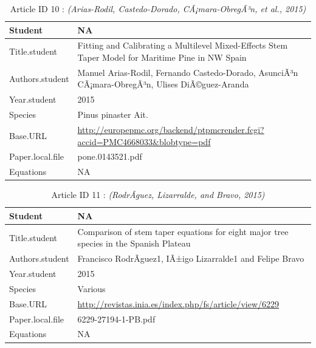 \documentclass[]{article}
\begin{document}
\begin{table}
\caption{
Article ID 10 : \textit{(Arias-Rodil, Castedo-Dorado, CÃ¡mara-ObregÃ³n, et al., 2015)}\\
}
\begin{tabular}{p{} p{}}
\hline
Student & NA \\ \hline
Title.student & Fitting and Calibrating a Multilevel Mixed-Effects Stem Taper Model for Maritime Pine in NW Spain \\ \hline
Authors.student & Manuel Arias-Rodil, Fernando Castedo-Dorado, AsunciÃ³n CÃ¡mara-ObregÃ³n, Ulises DiÃ©guez-Aranda \\ \hline
Year.student & 2015 \\ \hline
Species & Pinus pinaster Ait. \\ \hline
Base.URL & \url{http://europepmc.org/backend/ptpmcrender.fcgi?accid=PMC4668033&blobtype=pdf} \\ \hline
Paper.local.file & pone.0143521.pdf \\ \hline
Equations & NA \\ \hline
\end{tabular}\end{table}

\begin{table}
\caption{
Article ID 11 : \textit{(RodrÃ­guez, Lizarralde, and Bravo, 2015)}\\
}
\begin{tabular}{p{} p{}}
\hline
Student & NA \\ \hline
Title.student & Comparison of stem taper equations for eight major tree species in the Spanish Plateau \\ \hline
Authors.student & Francisco RodrÃ­guez1, IÃ±igo Lizarralde1 and Felipe Bravo \\ \hline
Year.student & 2015 \\ \hline
Species & Various \\ \hline
Base.URL & \url{http://revistas.inia.es/index.php/fs/article/view/6229} \\ \hline
Paper.local.file & 6229-27194-1-PB.pdf \\ \hline
Equations & NA \\ \hline
\end{tabular}\end{table}
\end{document}

